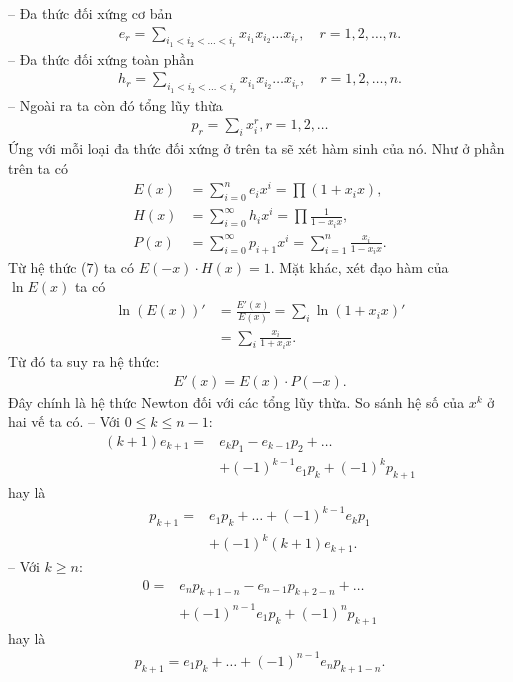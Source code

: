 \begin{multicols}{2}
	\vskip 0.1cm
	-- Đa thức đối xứng cơ bản
	\begin{align*}
		e_r=\sum_{i_1<i_2<\ldots<i_r}x_{i_1}x_{i_2}\ldots x_{i_r},\quad r=1,2,\ldots, n.
	\end{align*}
	-- Đa thức đối xứng toàn phần
	\begin{align*}
		h _r=\sum_{i_1<i_2<\ldots<i_r}x_{i_1}x_{i_2}\ldots x_{i_r},\quad r=1,2,\ldots,n.
	\end{align*}
	-- Ngoài ra ta còn đó tổng lũy thừa 
	\begin{align*}
		p_r=\sum_i x_i^r, r=1,2,\ldots
	\end{align*}
	Ứng với mỗi loại đa thức đối xứng ở trên ta sẽ xét hàm sinh của nó. Như ở phần trên ta có
	\begin{align*}
		E(x)&=\sum_{i=0}^n e_ix^i=\prod(1+x_ix),\\
		H(x)&=\sum_{i=0}^\infty h_i x^i=\prod\frac1{1-x_i x},\\
		P(x)&= \sum_{i=0}^\infty p_{i+1} x^{i}=\sum_{i=1}^n \frac {x_i}{1-x_i x}.
	\end{align*}	
	Từ hệ thức ($7$) ta có  $E(-x)\cdot H(x)=1$.
	\vskip 0.1cm
	Mặt khác, xét đạo hàm của $\ln E(x)$ ta có
	\begin{align*}
		\ln(E(x))'&=\frac{E'(x)}{E(x)}= \sum_i\ln\left({1+x_i x}\right)'\\
		&=\sum_i\frac{x_i}{1+x_i x}.
	\end{align*}
	Từ đó ta suy ra hệ thức:
	\begin{align*}
		E'(x)=E(x)\cdot P(-x).
	\end{align*}
	Đây chính là { hệ thức Newton} đối với các tổng lũy thừa.   
	So sánh hệ số của $x^{k}$ ở hai vế ta có.
	\vskip 0.1cm
	-- Với $0\leq k\leq n-1$:
	\begin{align*}
		(k+1)e_{k+1}=&e_kp_1-e_{k-1}p_2+\ldots\\
		&+(-1)^{k-1} e_1p_k+(-1)^{k}p_{k+1}
	\end{align*}
	hay là 
	\begin{align*}
		p_{k+1}=&e_1p_k+\ldots+(-1)^{k-1}e_kp_1\\
		&+(-1)^{k}(k+1)e_{k+1}.
	\end{align*}
	-- Với $k\geq n$:
	\begin{align*}
		0=&e_np_{k+1-n}-e_{n-1}p_{k+2-n}+\ldots\\
		&+(-1)^{n-1} e_1p_k+(-1)^{n}p_{k+1}
	\end{align*}
	hay là 
	\begin{align*}
		p_{k+1}=e_1p_k+\ldots+(-1)^{n-1}e_np_{k+1-n}.
	\end{align*}

\end{multicols}
